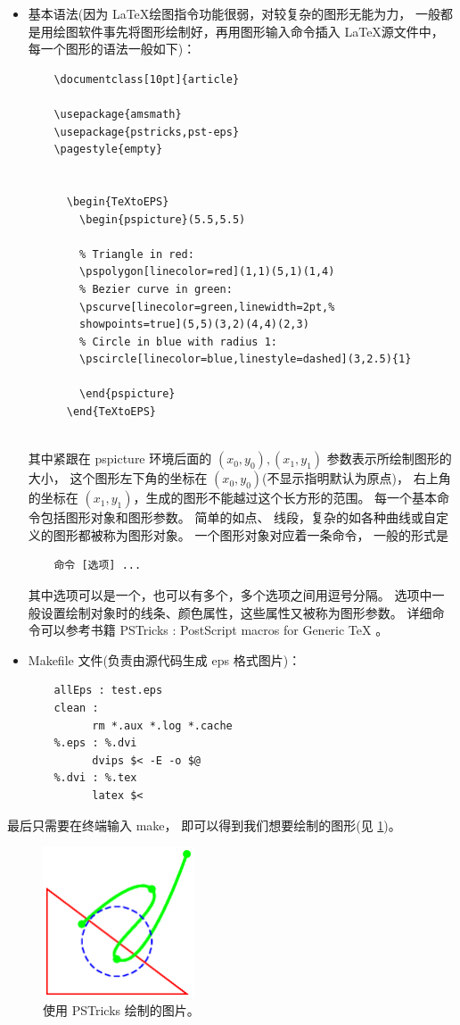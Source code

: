 \begin{itemize}
	
	\item 基本语法(因为 \LaTeX 绘图指令功能很弱，对较复杂的图形无能为力，
	一般都是用绘图软件事先将图形绘制好，再用图形输入命令插入 \LaTeX 源文件中，
	每一个图形的语法一般如下)：
	\begin{verbatim}
	\documentclass[10pt]{article}

	\usepackage{amsmath}
	\usepackage{pstricks,pst-eps}
	\pagestyle{empty}

	
  	  \begin{TeXtoEPS}
    	\begin{pspicture}(5.5,5.5)

      	% Triangle in red:
      	\pspolygon[linecolor=red](1,1)(5,1)(1,4)
      	% Bezier curve in green:
      	\pscurve[linecolor=green,linewidth=2pt,%
      	showpoints=true](5,5)(3,2)(4,4)(2,3)
     	% Circle in blue with radius 1:
      	\pscircle[linecolor=blue,linestyle=dashed](3,2.5){1}

    	\end{pspicture}
  	  \end{TeXtoEPS}
	
	\end{verbatim}
	其中紧跟在 pspicture 环境后面的 $(x_0,y_0), (x_1,y_1)$ 参数表示所绘制图形的大小，
	这个图形左下角的坐标在 $(x_0,y_0)$(不显示指明默认为原点)，
	右上角的坐标在 $(x_1,y_1)$，生成的图形不能越过这个长方形的范围。
	每一个基本命令包括图形对象和图形参数。
	简单的如点、 线段，复杂的如各种曲线或自定义的图形都被称为图形对象。
	一个图形对象对应着一条命令， 一般的形式是
	\begin{verbatim}
	命令 [选项] ... 
	\end{verbatim}	
	其中选项可以是一个，也可以有多个，多个选项之间用逗号分隔。
	选项中一般设置绘制对象时的线条、颜色属性，这些属性又被称为图形参数。
	详细命令可以参考书籍
	PSTricks : PostScript macros for Generic TeX \cite{van1993pstricks}。
	\item Makefile 文件(负责由源代码生成 eps 格式图片)：
	\begin{verbatim}
	allEps : test.eps
	clean :
　　　		rm *.aux *.log *.cache
	%.eps : %.dvi
　　　		dvips $< -E -o $@
	%.dvi : %.tex
　　　		latex $<
	\end{verbatim}
\end{itemize}

最后只需要在终端输入 make，
即可以得到我们想要绘制的图形(见 \ref{fig:pstricks})。

\begin{figure}[htbp]
	\centering
	\includegraphics[width=0.4\textwidth]{eps/pstricks}
	\caption{使用 PSTricks 绘制的图片。}
	\label{fig:pstricks}
\end{figure}


